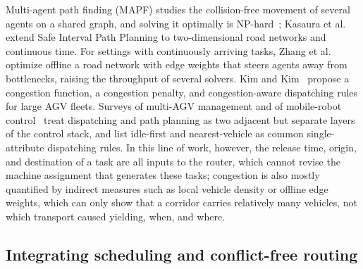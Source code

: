 Multi-agent path finding (MAPF) studies the collision-free movement of several agents on a shared graph, and solving it optimally is NP-hard~\cite{gao2023mapf}; Kasaura et al.~\cite{kasaura2022sipp} extend Safe Interval Path Planning to two-dimensional road networks and continuous time.
For settings with continuously arriving tasks, Zhang et al.~\cite{zhang2024guidance} optimize offline a road network with edge weights that steers agents away from bottlenecks, raising the throughput of several solvers.
Kim and Kim~\cite{kim2026congestion} propose a congestion function, a congestion penalty, and congestion-aware dispatching rules for large AGV fleets.
Surveys of multi-AGV management and of mobile-robot control~\cite{lu2022agv,fragapane2021planning} treat dispatching and path planning as two adjacent but separate layers of the control stack, and list idle-first and nearest-vehicle as common single-attribute dispatching rules.
In this line of work, however, the release time, origin, and destination of a task are all inputs to the router, which cannot revise the machine assignment that generates these tasks; congestion is also mostly quantified by indirect measures such as local vehicle density or offline edge weights, which can only show that a corridor carries relatively many vehicles, not which transport caused yielding, when, and where.

\subsection{Integrating scheduling and conflict-free routing}

